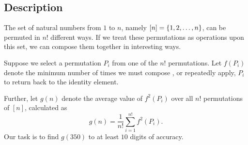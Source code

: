 \subsection{Description}

The set of natural numbers from \( 1 \) to \( n \), namely \( \left[ n \right] = \left\{ 1, 2, \ldots, n \right\} \), can be permuted in \( n! \) different ways. If we treat these permutations as operations upon this set, we can compose them together in interesting ways.

Suppose we select a permutation \( P_i \) from one of the \( n! \) permutations. Let \( f \left( P_i \right) \) denote the minimum number of times we must compose , or repeatedly apply, \( P_i \) to return back to the identity element.

Further, let \( g \left( n \right) \) denote the average value of \( f^2 \left( P_i \right) \) over all \( n! \) permutations of \( \left[n\right] \), calculated as
\[
    g \left( n \right) = \frac{1}{n!} \sum_{i = 1}^{n!} f^2 \left( P_i \right).
\]
Our task is to find \( g \left( 350 \right) \) to at least \( 10 \) digits of accuracy.

\vspace{0.5cm}
